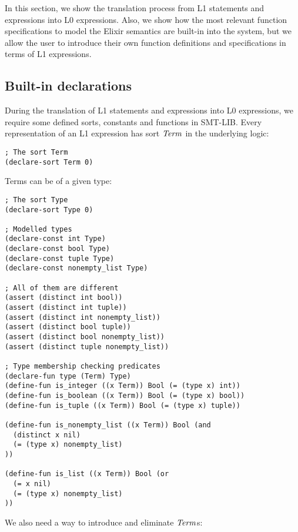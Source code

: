In this section, we show the translation process from L1 statements and
expressions into L0 expressions. Also, we show how the most relevant function
specifications to model the Elixir semantics are built-in into the system, but
we allow the user to introduce their own function definitions and specifications
in terms of L1 expressions.

\subsection{Built-in declarations}

During the translation of L1 statements and expressions into L0 expressions, we 
require some defined sorts, constants and functions in SMT-LIB. Every representation
of an L1 expression has sort $\mathit{Term}$ in the underlying logic:

\begin{verbatim}
; The sort Term
(declare-sort Term 0)
\end{verbatim}

Terms can be of a given type:

\begin{verbatim}
; The sort Type
(declare-sort Type 0)

; Modelled types
(declare-const int Type)
(declare-const bool Type)
(declare-const tuple Type)
(declare-const nonempty_list Type)

; All of them are different
(assert (distinct int bool))
(assert (distinct int tuple))
(assert (distinct int nonempty_list))
(assert (distinct bool tuple))
(assert (distinct bool nonempty_list))
(assert (distinct tuple nonempty_list))

; Type membership checking predicates
(declare-fun type (Term) Type)
(define-fun is_integer ((x Term)) Bool (= (type x) int))
(define-fun is_boolean ((x Term)) Bool (= (type x) bool))
(define-fun is_tuple ((x Term)) Bool (= (type x) tuple))

(define-fun is_nonempty_list ((x Term)) Bool (and
  (distinct x nil) 
  (= (type x) nonempty_list)
))

(define-fun is_list ((x Term)) Bool (or 
  (= x nil) 
  (= (type x) nonempty_list)
))
\end{verbatim}

We also need a way to introduce and eliminate $\mathit{Term}$s:

